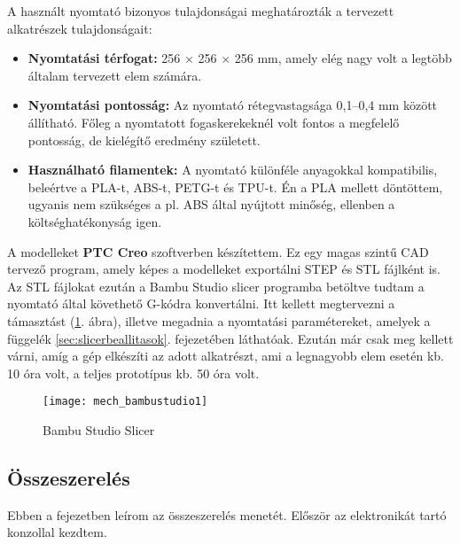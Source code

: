 A használt nyomtató bizonyos tulajdonságai meghatározták a tervezett alkatrészek tulajdonságait:

\begin{itemize}
	\item \textbf{Nyomtatási térfogat:} 256 × 256 × 256 mm, amely elég nagy volt a legtöbb általam tervezett elem számára.
	\item \textbf{Nyomtatási pontosság:} Az nyomtató rétegvastagsága 0,1–0,4 mm között állítható. Főleg a nyomtatott fogaskerekeknél volt fontos a megfelelő pontosság, de kielégítő eredmény született.
	\item \textbf{Használható filamentek:} A nyomtató különféle anyagokkal kompatibilis, beleértve a PLA-t, ABS-t, PETG-t és TPU-t. Én a PLA mellett döntöttem, ugyanis nem szükséges a pl. ABS által nyújtott minőség, ellenben a költséghatékonyság igen.
\end{itemize}

A modelleket \textbf{PTC Creo} szoftverben készítettem. Ez egy magas szintű CAD tervező program, amely képes a modelleket exportálni STEP és STL fájlként is. Az STL fájlokat ezután a Bambu Studio slicer programba betöltve tudtam a nyomtató által követhető G-kódra konvertálni. Itt kellett megtervezni a támasztást (\ref{fig:mech_bambustudio1}. ábra), illetve megadnia a nyomtatási paramétereket, amelyek a függelék \ref{sec:slicerbeallitasok}. fejezetében láthatóak. Ezután már csak meg kellett várni, amíg a gép elkészíti az adott alkatrészt, ami a legnagyobb elem esetén kb. 10 óra volt, a teljes prototípus kb. 50 óra volt.

\begin{figure}[h!]
	\centering
	\texttt{[image: mech\_bambustudio1]} 
	\caption{Bambu Studio Slicer}
	\label{fig:mech_bambustudio1}
\end{figure}

\pagebreak
\subsection{Összeszerelés}

Ebben a fejezetben leírom az összeszerelés menetét. Először az elektronikát tartó konzollal kezdtem.

